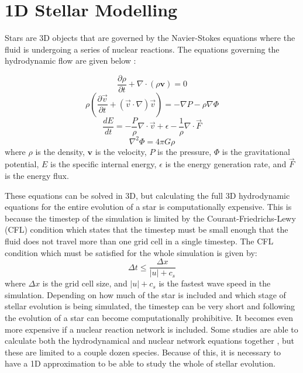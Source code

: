 \section{1D Stellar Modelling}\label{sec:1d_stellar_modelling}

Stars are 3D objects that are governed by the Navier-Stokes equations where the fluid is undergoing a series of nuclear reactions. 
The equations governing the hydrodynamic flow are given below \citep{kippenhahnStellarStructureEvolution2013}:

\begin{equation}
\frac{\partial \rho}{\partial t} + \nabla \cdot (\rho \mathbf{v}) = 0
\label{eq:continuity}
\end{equation}
\begin{equation}
\rho \left( \frac{\partial \vec{v}}{\partial t} + (\vec{v} \cdot \nabla)\vec{v} \right) = -\nabla P - \rho \nabla \Phi
\label{eq:momentum}
\end{equation}
\begin{equation}
\frac{d E}{d t} = -\frac{P}{\rho} \nabla \cdot \vec{v} + \epsilon - \frac{1}{\rho} \nabla \cdot \vec{F}
\label{eq:energy}
\end{equation}
\begin{equation}
\nabla^2 \Phi = 4 \pi G \rho
\label{eq:poisson}
\end{equation}
where $\rho$ is the density, $\mathbf{v}$ is the velocity, $P$ is the pressure, $\Phi$ is the gravitational potential, $E$ is the specific internal energy, $\epsilon$ is the energy generation rate, and $\vec{F}$ is the energy flux.

These equations can be solved in 3D, but calculating the full 3D hydrodynamic equations for the entire evolution of a star is computationally expensive.
This is because the timestep of the simulation is limited by the Courant-Friedrichs-Lewy (CFL) condition \citep{courantUeberPartiellenDifferenzengleichungen1928, vialletNewGenerationMultidimensional2011} which states that the timestep must be small enough that the fluid does not travel more than one grid cell in a single timestep.
The CFL condition which must be satisfied for the whole simulation is given by:
\begin{equation}
\Delta t \leq \frac{\Delta x}{|u| + c_s}
\end{equation}
where $\Delta x$ is the grid cell size, and $|u|+c_s$ is the fastest wave speed in the simulation.
Depending on how much of the star is included and which stage of stellar evolution is being simulated, the timestep can be very short and following the evolution of a star can become computationally prohibitive.
It becomes even more expensive if a nuclear reaction network is included.
Some studies are able to calculate both the hydrodynamical and nuclear network equations together \citep{rizzutiStellarEvolutionConvection2024}, but these are limited to a couple dozen species.
Because of this, it is necessary to have a 1D approximation to be able to study the whole of stellar evolution.


